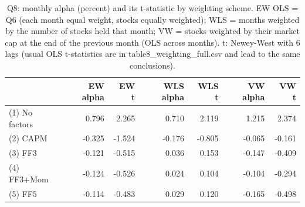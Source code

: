 \begin{table}
\caption{Q8: monthly alpha (percent) and its t-statistic by weighting scheme. EW OLS = Q6 (each month equal weight, stocks equally weighted); WLS = months weighted by the number of stocks held that month; VW = stocks weighted by their market cap at the end of the previous month (OLS across months). t: Newey-West with 6 lags (usual OLS t-statistics are in table8\_weighting\_full.csv and lead to the same conclusions).}
\label{tab:q8}
\begin{tabular}{lrrrrrr}
\toprule
 & EW alpha & EW t & WLS alpha & WLS t & VW alpha & VW t \\
\midrule
(1) No factors & 0.796 & 2.265 & 0.710 & 2.119 & 1.215 & 2.374 \\
(2) CAPM & -0.325 & -1.524 & -0.176 & -0.805 & -0.065 & -0.161 \\
(3) FF3 & -0.121 & -0.515 & 0.036 & 0.153 & -0.147 & -0.409 \\
(4) FF3+Mom & -0.124 & -0.526 & 0.024 & 0.104 & -0.104 & -0.294 \\
(5) FF5 & -0.114 & -0.483 & 0.029 & 0.120 & -0.165 & -0.498 \\
\bottomrule
\end{tabular}
\end{table}
